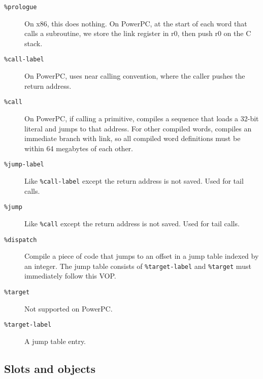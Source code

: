 \documentclass{book}
\begin{document}
\begin{description}

\item[\texttt{\%prologue}] On x86, this does nothing. On PowerPC, at the start of
  each word that calls a subroutine, we store the link
  register in r0, then push r0 on the C stack.

\item[\texttt{\%call-label}] On PowerPC, uses near calling convention, where the
  caller pushes the return address.

\item[\texttt{\%call}] On PowerPC, if calling a primitive, compiles a sequence that loads a 32-bit literal and jumps to that address. For other compiled words, compiles an immediate branch with link, so all compiled word definitions must be within 64 megabytes of each other.

\item[\texttt{\%jump-label}] Like \texttt{\%call-label} except the return address is not saved. Used for tail calls.

\item[\texttt{\%jump}] Like \texttt{\%call} except the return address is not saved. Used for tail calls.

\item[\texttt{\%dispatch}] Compile a piece of code that jumps to an offset in a
  jump table indexed by an integer. The jump table consists of \texttt{\%target-label} and \texttt{\%target} must immediately follow this VOP.

\item[\texttt{\%target}] Not supported on PowerPC.

\item[\texttt{\%target-label}] A jump table entry.

\end{description}

\subsection{Slots and objects}
\end{document}
